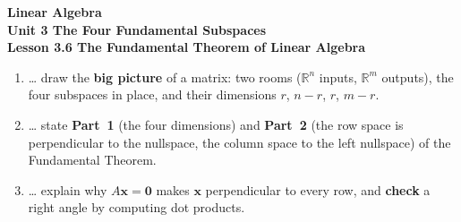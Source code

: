 \documentclass[10pt]{article}
\begin{document}
\vspace{-0.8in}

\begin{center}
  {\color{white}\textbf{\LARGE Linear Algebra}}\\[4pt]
  {\color{blushmid}\large\textbf{Unit 3 \quad The Four Fundamental Subspaces}}\\[6pt]
  {\color{white}\textbf{\large Lesson 3.6 \quad The Fundamental Theorem of Linear Algebra}}
\end{center}

\vspace{0.22in}
\namedateperiod
\vspace{0.18in}

\begin{learningtargetbox}
\small
\begin{enumerate}[leftmargin=1.5em, itemsep=5pt]
  \item \ldots{} draw the \textbf{big picture} of a matrix: two rooms ($\mathbb{R}^n$ inputs, $\mathbb{R}^m$ outputs), the four subspaces in place, and their dimensions $r$, $n-r$, $r$, $m-r$.
  \item \ldots{} state \textbf{Part~1} (the four dimensions) and \textbf{Part~2} (the row space is perpendicular to the nullspace, the column space to the left nullspace) of the Fundamental Theorem.
  \item \ldots{} explain why $A\mathbf{x}=\mathbf{0}$ makes $\mathbf{x}$ perpendicular to every row, and \textbf{check} a right angle by computing dot products.
\end{enumerate}
\end{learningtargetbox}

\vspace{0.14in}
\end{document}
